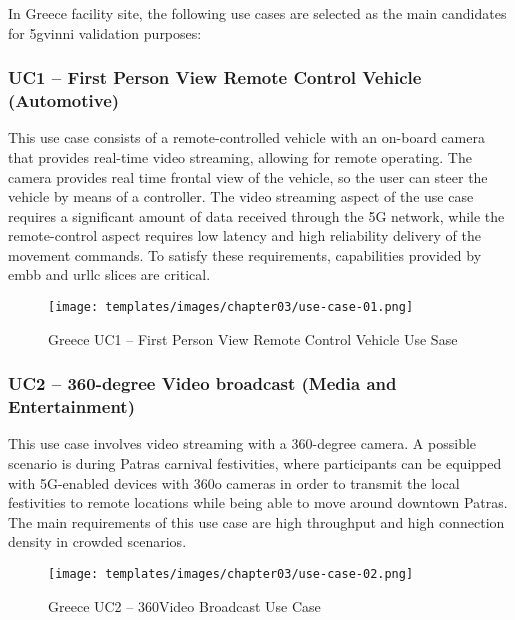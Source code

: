     In Greece facility site, the following use cases are selected as the main candidates for \acrshort{5gvinni} validation purposes:
    
\newpage
    
    \subsubsection{UC1 – First Person View Remote Control Vehicle (Automotive)}
    This use case consists of a remote-controlled vehicle with an on-board camera that provides real-time video streaming, allowing for remote operating. The camera provides real time frontal view of the vehicle, so the user can steer the vehicle by means of a controller. The video streaming aspect of the use case requires a significant amount of data received through the 5G network, while the remote-control aspect requires low latency and high reliability delivery of the movement commands. To satisfy these requirements, capabilities provided by \acrshort{embb} and \acrshort{urllc} slices are critical.
\medskip
    \begin{figure}[!ht]
        \centering
        \texttt{[image: templates/images/chapter03/use-case-01.png]}
        \caption{Greece UC1 – First Person View Remote Control Vehicle Use Sase}
        \label{fig:uc1}
    \end{figure}     

    \subsubsection{UC2 – 360-degree Video broadcast (Media and Entertainment)}
    This use case involves video streaming with a 360-degree camera. A possible scenario is during Patras carnival festivities, where participants can be equipped with 5G-enabled devices with 360o cameras in order to transmit the local festivities to remote locations while being able to move around downtown Patras. The main requirements of this use case are high throughput and high connection density in crowded scenarios. 
\medskip
    \begin{figure}[!ht]
        \centering
        \texttt{[image: templates/images/chapter03/use-case-02.png]}
        \caption{Greece UC2 – 360\degree Video Broadcast Use Case}
        \label{fig:uc2}
    \end{figure}  	
\newpage
